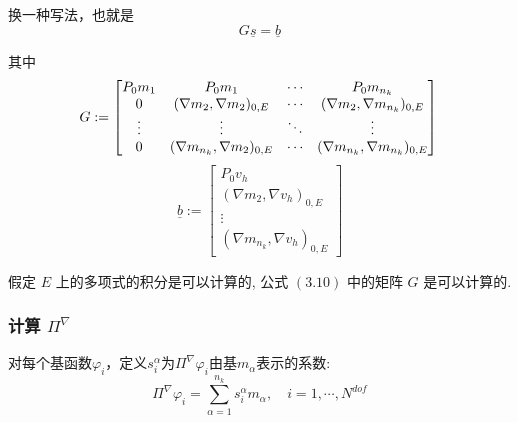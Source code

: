     换一种写法，也就是 \\
    \begin{equation}
    G\underline{s} = \underline{b}
    \end{equation}
    
    其中 \\
    \begin{equation}
    G := \begin{bmatrix}
    P_0m_1 & P_0m_1 &\cdots&P_0m_{n_k} \\
    0 & (\nabla m_2,\nabla m_2)_{0,E} & \cdots & (\nabla m_2,\nabla m_{n_k})_{0,E} \\
    \vdots & \vdots & \ddots & \vdots\\
    0& (\nabla m_{n_k},\nabla m_2)_{0,E} & \cdots & (\nabla m_{n_k},\nabla m_{n_k})_{0,E}
    \end{bmatrix}\\
    \end{equation}
    \begin{equation}
    \underline b := \begin{bmatrix}
    P_0v_h\\
    (\nabla m_2,\nabla v_h)_{0,E} \\
    \vdots\\
    (\nabla m_{n_k},\nabla v_h)_{0,E} 
    \end{bmatrix}
    \end{equation}
    
    假定 $E$ 上的多项式的积分是可以计算的, 公式 $(3.10)$ 中的矩阵 $G$ 是可以计算的. \\
    \subsubsection{计算 $\Pi^{\nabla}$}

对每个基函数$\varphi_i$，定义$s_i^{\alpha}$为$\Pi^{\nabla}\varphi_i$由基$m_{\alpha}$表示的系数: \\
\begin{equation}
\Pi^\nabla \varphi_i = \sum_{\alpha = 1}^{n_k}s_{i}^{\alpha}m_\alpha,\quad i = 1,\cdots,N^{dof}
\end{equation}


